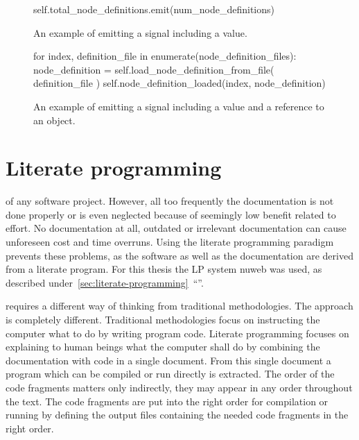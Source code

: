 \documentclass[%
    a4paper,    %
    justified,  %
    nobib,      %
    openany     %
]{tufte-book}
\makeatletter
\renewcommand{\label}[1]{\@tufte@label{##1}}%
\makeatother
\begin{document}
\begin{figure}
  \begin{pythoncode}
self.total_node_definitions.emit(num_node_definitions)
  \end{pythoncode}
  \label{lst:signal-slot-example-1}
  \caption{%
    An example of emitting a signal including a value.
  }
\end{figure}

\begin{figure}
  \begin{pythoncode}
for index, definition_file in enumerate(node_definition_files):
    node_definition = self.load_node_definition_from_file(
        definition_file
    )
    self.node_definition_loaded(index, node_definition)
  \end{pythoncode}
  \label{lst:signal-slot-example-2}
  \caption{%
    An example of emitting a signal including a value and a reference to an
    object.
  }
\end{figure}

\section{Literate programming}
\label{results:sec:literate-programming}

 of any
software project. However, all too frequently the documentation is not done
properly or is even neglected because of seemingly low benefit related to
effort. No documentation at all, outdated or irrelevant documentation can cause
unforeseen cost and time overruns. Using the literate programming paradigm
prevents these problems, as the software as well as the documentation are
derived from a literate program. For this thesis the LP system nuweb was used,
as described
under~\autoref{sec:literate-programming}~\enquote{}.

 requires a different
way of thinking from traditional methodologies. The approach is completely
different. Traditional methodologies focus on instructing the computer what to
do by writing program code. Literate programming focuses on explaining to human
beings what the computer shall do by combining the documentation with code in a
single document. From this single document a program which can be compiled or
run directly is extracted. The order of the code fragments matters only
indirectly, they may appear in any order throughout the text. The code fragments
are put into the right order for compilation or running by defining the output
files containing the needed code fragments in the right order.
\end{document}
